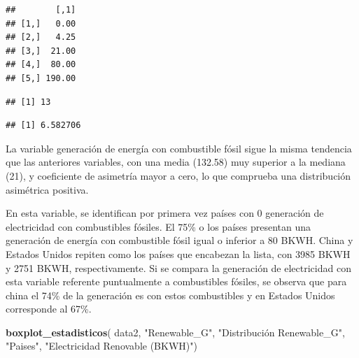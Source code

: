 \documentclass[
]{article}
\newenvironment{Shaded}{\begin{snugshade}}{\end{snugshade}}
\newcommand{\AttributeTok}[1]{\textcolor[rgb]{0.13,0.29,0.53}{#1}}
\newcommand{\CommentTok}[1]{\textcolor[rgb]{0.56,0.35,0.01}{\textit{#1}}}
\newcommand{\FunctionTok}[1]{\textcolor[rgb]{0.13,0.29,0.53}{\textbf{#1}}}
\newcommand{\NormalTok}[1]{#1}
\newcommand{\OtherTok}[1]{\textcolor[rgb]{0.56,0.35,0.01}{#1}}
\newcommand{\SpecialCharTok}[1]{\textcolor[rgb]{0.81,0.36,0.00}{\textbf{#1}}}
\newcommand{\StringTok}[1]{\textcolor[rgb]{0.31,0.60,0.02}{#1}}
\begin{document}
\begin{verbatim}
##        [,1]
## [1,]   0.00
## [2,]   4.25
## [3,]  21.00
## [4,]  80.00
## [5,] 190.00
\end{verbatim}

\begin{Shaded}
\end{Shaded}

\begin{verbatim}
## [1] 13
\end{verbatim}

\begin{Shaded}
\end{Shaded}

\begin{verbatim}
## [1] 6.582706
\end{verbatim}

La variable generación de energía con combustible fósil sigue la misma
tendencia que las anteriores variables, con una media (132.58) muy
superior a la mediana (21), y coeficiente de asimetría mayor a cero, lo
que comprueba una distribución asimétrica positiva.

En esta variable, se identifican por primera vez países con 0 generación
de electricidad con combustibles fósiles. El 75\% o los países presentan
una generación de energía con combustible fósil igual o inferior a 80
BKWH. China y Estados Unidos repiten como los países que encabezan la
lista, con 3985 BKWH y 2751 BKWH, respectivamente. Si se compara la
generación de electricidad con esta variable referente puntualmente a
combustibles fósiles, se observa que para china el 74\% de la generación
es con estos combustibles y en Estados Unidos corresponde al 67\%.

\begin{Shaded}
\begin{Highlighting}[]
\FunctionTok{boxplot\_estadisticos}\NormalTok{(}
\NormalTok{ data2,}
  \StringTok{"Renewable\_G"}\NormalTok{,}
  \StringTok{"Distribución Renewable\_G"}\NormalTok{,}
  \StringTok{"Paises"}\NormalTok{,}
  \StringTok{"Electricidad Renovable (BKWH)"}\NormalTok{)}
\end{Highlighting}
\end{Shaded}
\end{document}
